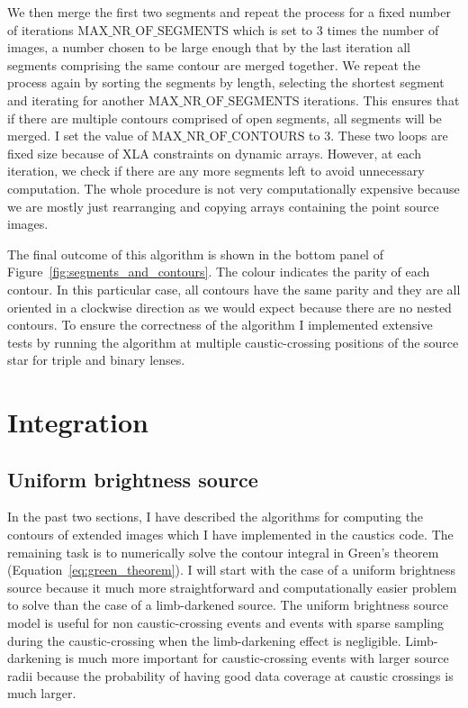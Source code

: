 \documentclass[12pt,dvipsnames]{report}
\newcommand{\ssf}[1]{\textsf{#1}}
\begin{document}
We then merge the first two segments and repeat the process for a fixed number of iterations 
$\text{MAX\_NR\_OF\_SEGMENTS}$ which is set to 3 times the number of images, a number 
chosen to be large enough that by the last iteration all segments comprising the same contour 
are merged together. 
We repeat the process again by sorting the segments by length, selecting the shortest 
segment and iterating for another $\text{MAX\_NR\_OF\_SEGMENTS}$ iterations. This ensures that
if there are multiple contours comprised of open segments, all segments will be merged. 
I set the value of $\text{MAX\_NR\_OF\_CONTOURS}$ to 3.
These two loops are fixed size because of \ssf{XLA} constraints on dynamic arrays. However, 
at each iteration, we check if there are 
any more segments left to avoid unnecessary computation. The whole procedure is not very 
computationally expensive because we are mostly just rearranging and copying arrays containing
the point source images.

The final outcome of this algorithm is shown in the bottom panel of 
Figure~\ref{fig:segments_and_contours}. The colour indicates the parity of each contour. 
In this  particular
case, all contours have the same parity and they are all oriented in a clockwise direction
as we would expect because there are no nested contours. To ensure the correctness of 
the algorithm I implemented extensive tests by running the algorithm at multiple caustic-crossing 
positions of the source star for triple and binary lenses. 

\section{Integration}
\label{sec:caustics_integration}
\subsection{Uniform brightness source}
\label{ssec:mag_uniform}
In the past two sections, I have described the algorithms for computing the contours of extended
images which I have implemented in the \ssf{caustics} code. The remaining task is to numerically 
solve the contour integral in Green's theorem (Equation~\ref{eq:green_theorem}). I will start 
with the case of a uniform brightness source because it much more straightforward and 
computationally easier problem to solve than the case of a limb-darkened source.
The uniform brightness source model is useful for non caustic-crossing events and events 
with sparse sampling during the caustic-crossing when the limb-darkening effect is negligible.
Limb-darkening is much more important for 
caustic-crossing events with larger source radii because the probability of having good data coverage at caustic
crossings is much larger. 
\end{document}
